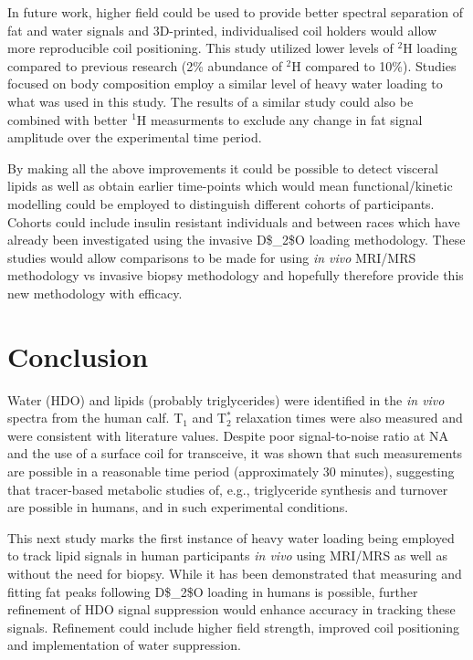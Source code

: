 In future work, higher field could be used to provide better spectral separation of fat and water signals and 3D-printed, individualised coil holders would allow more reproducible coil positioning. This study utilized lower levels of $^2$H loading compared to previous research (2\% abundance of $^2$H compared to 10\%). Studies focused on body composition employ a similar level of heavy water loading to what was used in this study. The results of a similar study could also be combined with better $^1$H measurments to exclude any change in fat signal amplitude over the experimental time period. 

By making all the above improvements it could be possible to detect visceral lipids as well as obtain earlier time-points which would mean functional/kinetic modelling could be employed to distinguish different cohorts of participants. Cohorts could include insulin resistant individuals \cite{White2017AssociationHumans} and between races \cite{White2018RacialHumans} which have already been investigated using the invasive \ac{D$_2$O} loading methodology. These studies would allow comparisons to be made for using \textit{in vivo} \ac{MRI}/\ac{MRS} methodology vs invasive biopsy methodology and hopefully therefore provide this new methodology with efficacy.

\section{Conclusion}

Water (\ac{HDO}) and lipids (probably triglycerides) were identified in the \textit{in vivo} spectra from the human calf. T$_1$ and T$_2^*$ relaxation times were also measured and were consistent with literature values. Despite poor signal-to-noise ratio at \ac{NA} and the use of a surface coil for transceive, it was shown that such measurements are possible in a reasonable time period (approximately 30 minutes), suggesting that tracer-based metabolic studies of, e.g., triglyceride synthesis and turnover are possible in humans, and in such experimental conditions.  

This next study marks the first instance of heavy water loading being employed to track lipid signals in human participants \textit{in vivo} using \ac{MRI}/\ac{MRS} as well as without the need for biopsy. While it has been demonstrated that measuring and fitting fat peaks following \ac{D$_2$O} loading in humans is possible, further refinement of \ac{HDO} signal suppression would enhance accuracy in tracking these signals. Refinement could include higher field strength, improved coil positioning and implementation of water suppression. 


% 